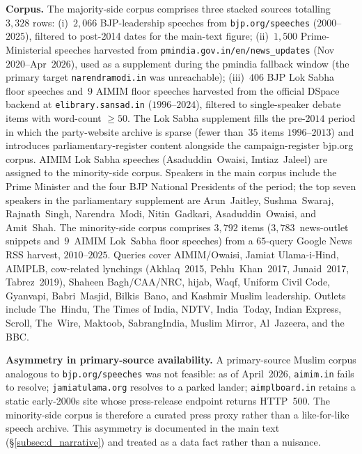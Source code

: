 \documentclass[11pt,twoside]{extarticle}
\begin{document}
\textbf{Corpus.} The majority-side corpus comprises three stacked sources
totalling $3{,}328$ rows: (i)~$2{,}066$ BJP-leadership speeches from
\texttt{bjp.org/speeches} ($2000$--$2025$), filtered to post-2014 dates for
the main-text figure; (ii)~$1{,}500$ Prime-Ministerial speeches harvested
from \texttt{pmindia.gov.in/en/news\_updates} (Nov~$2020$--Apr~$2026$), used
as a supplement during the pmindia fallback window (the primary target
\texttt{narendramodi.in} was unreachable); (iii)~$406$ BJP Lok Sabha floor
speeches and~$9$ AIMIM floor speeches harvested from the official DSpace
backend at \texttt{elibrary.sansad.in} ($1996$--$2024$), filtered to
single-speaker debate items with word-count $\geq 50$. The Lok Sabha
supplement fills the pre-$2014$ period in which the party-website archive
is sparse (fewer than~$35$ items $1996$--$2013$) and introduces
parliamentary-register content alongside the campaign-register bjp.org
corpus. AIMIM Lok Sabha speeches (Asaduddin~Owaisi, Imtiaz~Jaleel) are
assigned to the minority-side corpus. Speakers in the main corpus include
the Prime Minister and the four BJP National Presidents of the period; the
top seven speakers in the parliamentary supplement are Arun~Jaitley,
Sushma~Swaraj, Rajnath~Singh, Narendra~Modi, Nitin~Gadkari,
Asaduddin~Owaisi, and Amit~Shah. The minority-side corpus comprises
$3{,}792$ items ($3{,}783$~news-outlet snippets and~$9$~AIMIM Lok~Sabha
floor speeches) from a $65$-query Google News RSS harvest, $2010$--$2025$.
Queries cover AIMIM/Owaisi, Jamiat Ulama-i-Hind, AIMPLB, cow-related
lynchings (Akhlaq~2015, Pehlu~Khan~2017, Junaid~2017, Tabrez~2019), Shaheen
Bagh/CAA/NRC, hijab, Waqf, Uniform Civil Code, Gyanvapi, Babri~Masjid,
Bilkis~Bano, and Kashmir Muslim leadership. Outlets include The~Hindu, The
Times of India, NDTV, India~Today, Indian Express, Scroll, The~Wire,
Maktoob, SabrangIndia, Muslim Mirror, Al~Jazeera, and the BBC.

\textbf{Asymmetry in primary-source availability.} A primary-source Muslim
corpus analogous to \texttt{bjp.org/speeches} was not feasible: as of
April~2026, \texttt{aimim.in} fails to resolve; \texttt{jamiatulama.org}
resolves to a parked lander; \texttt{aimplboard.in} retains a static
early-2000s site whose press-release endpoint returns HTTP~500. The
minority-side corpus is therefore a curated press proxy rather than a
like-for-like speech archive. This asymmetry is documented in the main text
(\S\ref{subsec:d_narrative}) and treated as a data fact rather than a
nuisance.
\end{document}
